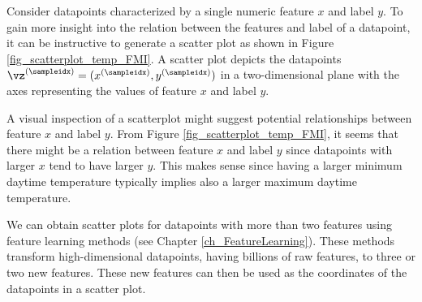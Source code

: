 \documentclass[12pt]{report}
\begin{document}
Consider datapoints characterized by a single numeric feature $x$ 
and label $y$. 
To gain more insight into the relation between the features 
and label of a datapoint, it can be instructive to generate a 
scatter plot as shown in Figure \ref{fig_scatterplot_temp_FMI}. 
A scatter plot depicts the datapoints $\vz^{(\sampleidx)}=(x^{(\sampleidx)},y^{(\sampleidx)})$ 
in a two-dimensional plane with the axes representing the values 
of feature $x$ and label $y$. 

A visual inspection of a scatterplot might suggest potential 
relationships between feature $x$ and label $y$. From Figure 
\ref{fig_scatterplot_temp_FMI}, it seems that there might be 
a relation between feature $x$ and label $y$ since datapoints 
with larger $x$ tend to have larger $y$. This makes sense since 
having a larger minimum daytime temperature typically implies 
also a larger maximum daytime temperature. 

We can obtain scatter plots for datapoints with more than two 
features using feature learning methods (see Chapter \ref{ch_FeatureLearning}). 
These methods transform high-dimensional datapoints, 
having billions of raw features, to three or two new features. 
These new features can then be used as the coordinates of 
the datapoints in a scatter plot.

\end{document}
